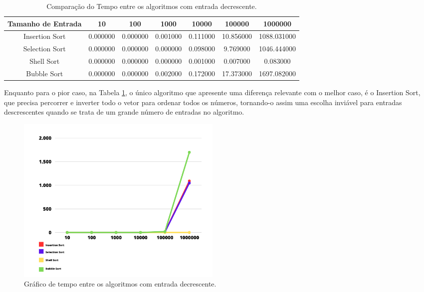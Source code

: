 \begin{table}[h]
    \centering
    \caption{Comparação do Tempo entre os algoritmos com entrada decrescente.}
    \begin{tabular}{|c|c|c|c|c|c|c|}
        \hline
        Tamanho de Entrada & 10 & 100 & 1000 & 10000 & 100000 & 1000000 \\
        \hline
        Insertion Sort & 0.000000 & 0.000000 & 0.001000 & 0.111000 & 10.856000 & 1088.031000 \\
        \hline
        Selection Sort & 0.000000 & 0.000000 & 0.000000 & 0.098000 & 9.769000 & 1046.444000 \\
        \hline
        Shell Sort & 0.000000 & 0.000000 & 0.000000 & 0.001000 & 0.007000 & 0.083000 \\
        \hline
        Bubble Sort & 0.000000 & 0.000000 & 0.002000 & 0.172000 & 17.373000 & 1697.082000 \\
        \hline
    \end{tabular}
    \label{tab:comparacaogeral2}
\end{table}

Enquanto para o pior caso, na Tabela \ref{tab:comparacaogeral2}, o único algoritmo que apresente uma diferença relevante com o melhor caso, é o Insertion Sort, que precisa percorrer e inverter todo o vetor para ordenar todos os números, tornando-o assim uma escolha inviável para entradas descrescentes quando se trata de um grande número de entradas no algoritmo.

\begin{figure}[h!]
    \centering
    \includegraphics[width = 10cm]{Imagens/Geral/Captura de tela 2023-09-27 220558.png}
    \caption{Gráfico de tempo entre os algoritmos com entrada decrescente.}
    \label{fig:geral2}
\end{figure}
\newpage
